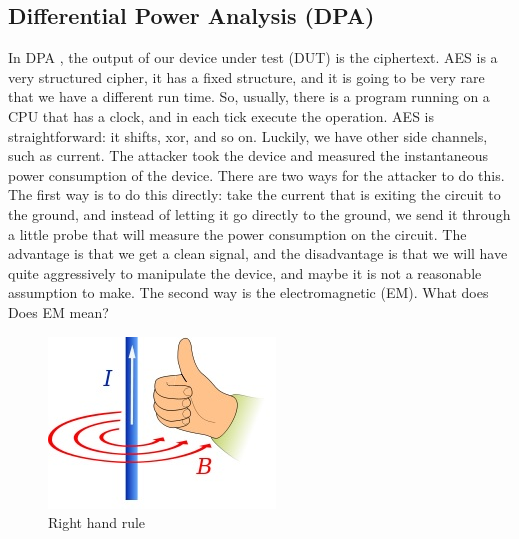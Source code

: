 \subsection{Differential Power Analysis (DPA)}\label{c8_prev_lectures_recap_dpa_sc:subsec}

In DPA \cite{kocher1999differential, kocher1998introduction}, the output of our device under test (DUT) is the ciphertext. AES is a
very structured cipher, it has a fixed structure, and it is going to be very rare
that we have a different run time. So, usually, there is a program running
on a CPU that has a clock, and in each tick execute the operation. AES is straightforward: it shifts, xor, and so on. Luckily, we have other side channels, such as
current. The attacker took the device and measured the instantaneous power
consumption of the device. There are two ways for the attacker to do this. The
first way is to do this directly: take the current that is exiting the circuit
to the ground, and instead of letting it go directly to the ground, we send it
through a little probe that will measure the power consumption on the circuit.
The advantage is that we get a clean signal, and the disadvantage is that we
will have quite aggressively to manipulate the device, and maybe it is not a
reasonable assumption to make. The second way is the electromagnetic (EM). What does
Does EM mean?

\begin{figure}[!ht]
    \centering
    \includegraphics{images/chapter8/right_hand_rule.jpeg}
    \caption{Right hand rule} \label{c8_right_hand_rule:fig}
\end{figure}

